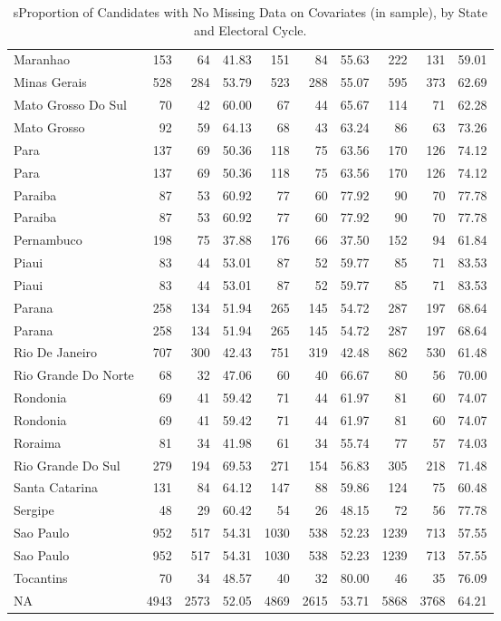 \documentclass[12pt,english]{article}
\newcommand{\lyxdot}{.}
\numberwithin{equation}{section}
\theoremstyle{plain}
\theoremstyle{remark}
\theoremstyle{plain}
\begin{document}
\begin{table}[H]
\begin{tabular}{lrrrrrrrrr}
  Maranhao & 153 & 64 & 41.83 & 151 & 84 & 55.63 & 222 & 131 & 59.01\\
  \addlinespace
  Minas Gerais & 528 & 284 & 53.79 & 523 & 288 & 55.07 & 595 & 373 & 62.69\\
  Mato Grosso Do Sul & 70 & 42 & 60.00 & 67 & 44 & 65.67 & 114 & 71 & 62.28\\
  Mato Grosso & 92 & 59 & 64.13 & 68 & 43 & 63.24 & 86 & 63 & 73.26\\
  Para & 137 & 69 & 50.36 & 118 & 75 & 63.56 & 170 & 126 & 74.12\\
  Para & 137 & 69 & 50.36 & 118 & 75 & 63.56 & 170 & 126 & 74.12\\
  \addlinespace
  Paraiba & 87 & 53 & 60.92 & 77 & 60 & 77.92 & 90 & 70 & 77.78\\
  Paraiba & 87 & 53 & 60.92 & 77 & 60 & 77.92 & 90 & 70 & 77.78\\
  Pernambuco & 198 & 75 & 37.88 & 176 & 66 & 37.50 & 152 & 94 & 61.84\\
  Piaui & 83 & 44 & 53.01 & 87 & 52 & 59.77 & 85 & 71 & 83.53\\
  Piaui & 83 & 44 & 53.01 & 87 & 52 & 59.77 & 85 & 71 & 83.53\\
  \addlinespace
  Parana & 258 & 134 & 51.94 & 265 & 145 & 54.72 & 287 & 197 & 68.64\\
  Parana & 258 & 134 & 51.94 & 265 & 145 & 54.72 & 287 & 197 & 68.64\\
  Rio De Janeiro & 707 & 300 & 42.43 & 751 & 319 & 42.48 & 862 & 530 & 61.48\\
  Rio Grande Do Norte & 68 & 32 & 47.06 & 60 & 40 & 66.67 & 80 & 56 & 70.00\\
  Rondonia & 69 & 41 & 59.42 & 71 & 44 & 61.97 & 81 & 60 & 74.07\\
  \addlinespace
  Rondonia & 69 & 41 & 59.42 & 71 & 44 & 61.97 & 81 & 60 & 74.07\\
  Roraima & 81 & 34 & 41.98 & 61 & 34 & 55.74 & 77 & 57 & 74.03\\
  Rio Grande Do Sul & 279 & 194 & 69.53 & 271 & 154 & 56.83 & 305 & 218 & 71.48\\
  Santa Catarina & 131 & 84 & 64.12 & 147 & 88 & 59.86 & 124 & 75 & 60.48\\
  Sergipe & 48 & 29 & 60.42 & 54 & 26 & 48.15 & 72 & 56 & 77.78\\
  \addlinespace
  Sao Paulo & 952 & 517 & 54.31 & 1030 & 538 & 52.23 & 1239 & 713 & 57.55\\
  Sao Paulo & 952 & 517 & 54.31 & 1030 & 538 & 52.23 & 1239 & 713 & 57.55\\
  Tocantins & 70 & 34 & 48.57 & 40 & 32 & 80.00 & 46 & 35 & 76.09\\
  NA & 4943 & 2573 & 52.05 & 4869 & 2615 & 53.71 & 5868 & 3768 & 64.21\\
  \bottomrule
  \end{tabular}
  \endgroup{}
  \caption{sProportion of Candidates with No Missing Data on Covariates (in sample), by State and Electoral Cycle.}
\label{coverage}
  \end{table}

{\linespread{1} \small  
}
\end{document}
